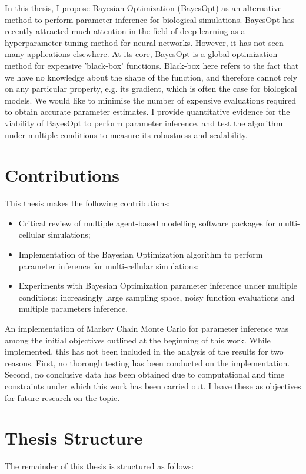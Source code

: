 \documentclass[bsc,frontabs,singlespacing,parskip,deptreport]{infthesis}
\begin{document}
In this thesis, I propose Bayesian Optimization (BayesOpt) as an alternative method to perform parameter inference for biological simulations. BayesOpt has recently attracted much attention in the field of deep learning as a hyperparameter tuning method for neural networks. However, it has not seen many applications elsewhere. At its core, BayesOpt is a global optimization method for expensive 'black-box' functions. Black-box here refers to the fact that we have no knowledge about the shape of the function, and therefore cannot rely on any particular property, e.g. its gradient, which is often the case for biological models. We would like to minimise the number of expensive evaluations required to obtain accurate parameter estimates. I provide quantitative evidence for the viability of BayesOpt to perform parameter inference, and test the algorithm under multiple conditions to measure its robustness and scalability.

\section{Contributions}
This thesis makes the following contributions:

\begin{itemize}
    \item Critical review of multiple agent-based modelling software packages for multi-cellular simulations;
    
    \item Implementation of the Bayesian Optimization algorithm to perform parameter inference for multi-cellular simulations;
    
    \item Experiments with Bayesian Optimization parameter inference under multiple conditions: increasingly large sampling space, noisy function evaluations and multiple parameters inference.
\end{itemize}

An implementation of Markov Chain Monte Carlo for parameter inference was among the initial objectives outlined at the beginning of this work. While implemented, this has not been included in the analysis of the results for two reasons. First, no thorough testing has been conducted on the implementation. Second, no conclusive data has been obtained due to computational and time constraints under which this work has been carried out. I leave these as objectives for future research on the topic.

\section{Thesis Structure}
The remainder of this thesis is structured as follows:
\end{document}
